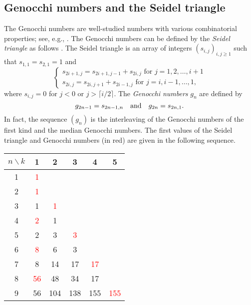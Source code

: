 \subsection{Genocchi numbers and the Seidel triangle}
The Genocchi numbers are well-studied numbers with various combinatorial
properties; see, e.g., \cite{Dum74, LW20}. The Genocchi numbers can be defined
by the \emph{Seidel triangle} as follows \cite{Sei77}.
The Seidel triangle is an array of integers $(s_{i,j})_{i,j\ge1}$
such that $s_{1,1}=s_{2,1}=1$ and
\[
  \begin{cases}
    s_{2i+1,j} = s_{2i+1,j-1} + s_{2i,j} \mbox{ for } j=1,2,\dots, i+1\\
    s_{2i,j} = s_{2i,j+1} + s_{2i-1,j} \mbox{ for } j=i,i-1,\dots,1,
  \end{cases}
\]
where $s_{i,j}=0$ for $j<0$ or $j>\lceil i/2\rceil$.
The \emph{Genocchi numbers} $g_n$ are defined by
\[
  g_{2n-1}=s_{2n-1,n} \quad\mbox{and}\quad g_{2n}=s_{2n,1}.
\]
In fact, the sequence $(g_n)$ is the interleaving of the Genocchi numbers of
the first kind and the median Genocchi numbers.
The first values of the Seidel triangle and Genocchi numbers (in red)
are given in the following sequence. 

\begin{center}
  \begin{tabular}{c|ccccc}
    \( n\backslash k \) & 1 & 2 & 3 & 4 & 5 \\ \hline
    1 & \textcolor{red}{1} & & & & \\
    2 & \textcolor{red}{1} & & & & \\
    3 & 1 & \textcolor{red}{1} & & & \\
    4 & \textcolor{red}{2} & 1 & & & \\
    5 & 2 & 3 & \textcolor{red}{3} & & \\
    6 & \textcolor{red}{8} & 6 & 3 & & \\ 
    7 & 8 & 14 & 17 & \textcolor{red}{17} & \\
    8 & \textcolor{red}{56} & 48 & 34 & 17 &\\
    9 & 56 & 104 & 138 & 155 & \textcolor{red}{155}\\
  \end{tabular}
\end{center}

